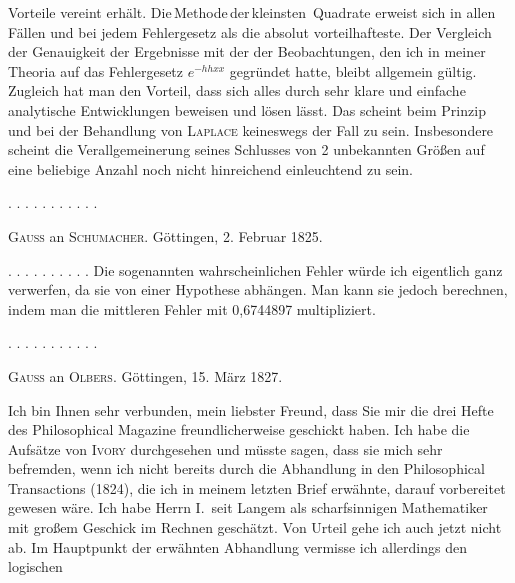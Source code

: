 Vorteile vereint erhält. Die\,Methode\,der\,kleinsten\ Quadrate erweist sich in allen Fällen und bei jedem Fehlergesetz als die absolut vorteilhafteste. Der Vergleich der Genauigkeit der Ergebnisse mit der der Beobachtungen, den ich in meiner Theoria auf das Fehlergesetz $e^{-hhxx}$ gegründet hatte, bleibt allgemein gültig. Zugleich hat man den Vorteil, dass sich alles durch sehr klare und einfache analytische Entwicklungen beweisen und lösen lässt. Das scheint beim Prinzip und bei der Behandlung von \textsc{Laplace} keineswegs der Fall zu sein. Insbesondere scheint die Verallgemeinerung seines Schlusses von 2 unbekannten Größen auf eine beliebige Anzahl noch nicht hinreichend einleuchtend zu sein.

\noindent . . . . . . . . . . .



\begin{center}
\textsc{Gauss} an \textsc{Schumacher}. Göttingen, 2. Februar 1825.
\end{center}

\noindent . . . . . . . . . . Die sogenannten wahrscheinlichen Fehler würde ich eigentlich ganz verwerfen, da sie von einer Hypothese abhängen. Man kann sie jedoch berechnen, indem man die mittleren Fehler mit 0,6744897 multipliziert.

\noindent . . . . . . . . . . .



\begin{center}
\textsc{Gauss} an \textsc{Olbers}. Göttingen, 15. März 1827.
\end{center}

\noindent Ich bin Ihnen sehr verbunden, mein liebster Freund, dass Sie mir die drei Hefte des Philosophical Magazine freundlicherweise geschickt haben. Ich habe die Aufsätze von \textsc{Ivory} durchgesehen und müsste sagen, dass sie mich sehr befremden, wenn ich nicht bereits durch die Abhandlung in den Philosophical Transactions (1824), die ich in meinem letzten Brief erwähnte, darauf vorbereitet gewesen wäre. Ich habe Herrn I.\ seit Langem als scharfsinnigen Mathematiker mit großem Geschick im Rechnen geschätzt. Von  Urteil gehe ich auch jetzt nicht ab. Im Hauptpunkt der erwähnten Abhandlung vermisse ich allerdings den logischen\space%
